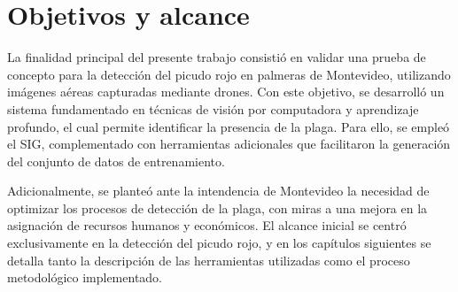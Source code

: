 
\section{Objetivos y alcance}
\label{sec:objetivos}

La finalidad principal del presente trabajo consistió en validar una prueba de concepto para la detección del picudo rojo en palmeras de Montevideo, utilizando imágenes aéreas capturadas mediante drones. Con este objetivo, se desarrolló un sistema fundamentado en técnicas de visión por computadora y aprendizaje profundo, el cual permite identificar la presencia de la plaga. Para ello, se empleó el SIG\footnotemark, complementado con herramientas adicionales que facilitaron la generación del conjunto de datos de entrenamiento.


Adicionalmente, se planteó ante la intendencia de Montevideo la necesidad de optimizar los procesos de detección de la plaga, con miras a una mejora en la asignación de recursos humanos y económicos. El alcance inicial se centró exclusivamente en la detección del picudo rojo, y en los capítulos siguientes se detalla tanto la descripción de las herramientas utilizadas como el proceso metodológico implementado.

